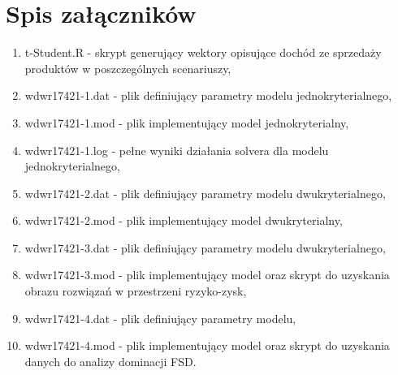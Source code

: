 \documentclass[11pt,a4paper]{article}
\begin{document}
\clearpage
{}
\listoftables

\section*{Spis załączników}
\begin{enumerate}
\item t-Student.R - skrypt generujący wektory opisujące dochód ze sprzedaży produktów w poszczególnych scenariuszy,
\item wdwr17421-1.dat - plik definiujący parametry modelu jednokryterialnego,
\item wdwr17421-1.mod - plik implementujący model jednokryterialny,
\item wdwr17421-1.log - pełne wyniki działania solvera dla modelu jednokryterialnego,
\item wdwr17421-2.dat - plik definiujący parametry modelu dwukryterialnego,
\item wdwr17421-2.mod - plik implementujący model dwukryterialny,
\item wdwr17421-3.dat - plik definiujący parametry modelu dwukryterialnego,
\item wdwr17421-3.mod - plik implementujący model oraz skrypt do uzyskania obrazu rozwiązań w przestrzeni ryzyko-zysk,
\item wdwr17421-4.dat - plik definiujący parametry modelu,
\item wdwr17421-4.mod - plik implementujący model oraz skrypt do uzyskania danych do analizy dominacji FSD.
\end{enumerate}
\end{document}
